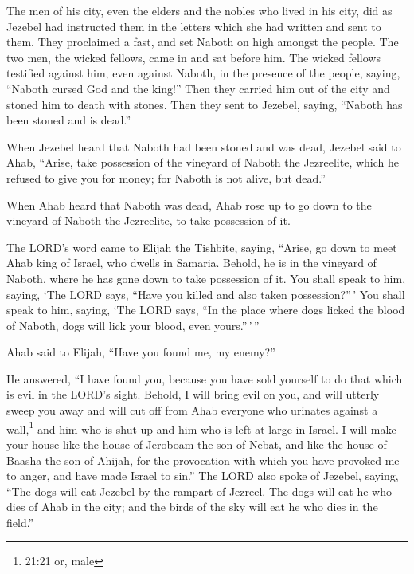  The men of his city, even the elders and the nobles who
lived in his city, did as Jezebel had instructed them in the letters
which she had written and sent to them.  They proclaimed a
fast, and set Naboth on high amongst the people.  The two
men, the wicked fellows, came in and sat before him. The wicked fellows
testified against him, even against Naboth, in the presence of the
people, saying, ``Naboth cursed God and the king!'' Then they carried
him out of the city and stoned him to death with stones. 
Then they sent to Jezebel, saying, ``Naboth has been stoned and is
dead.''

 When Jezebel heard that Naboth had been stoned and was
dead, Jezebel said to Ahab, ``Arise, take possession of the vineyard of
Naboth the Jezreelite, which he refused to give you for money; for
Naboth is not alive, but dead.''

 When Ahab heard that Naboth was dead, Ahab rose up to go
down to the vineyard of Naboth the Jezreelite, to take possession of it.

 The LORD's word came to Elijah the Tishbite, saying,
 ``Arise, go down to meet Ahab king of Israel, who dwells
in Samaria. Behold, he is in the vineyard of Naboth, where he has gone
down to take possession of it.  You shall speak to him,
saying, `The LORD says, ``Have you killed and also taken
possession?''\,' You shall speak to him, saying, `The LORD says, ``In
the place where dogs licked the blood of Naboth, dogs will lick your
blood, even yours.''\,'\,''

 Ahab said to Elijah, ``Have you found me, my enemy?''

He answered, ``I have found you, because you have sold yourself to do
that which is evil in the LORD's sight.  Behold, I will
bring evil on you, and will utterly sweep you away and will cut off from
Ahab everyone who urinates against a wall,\footnote{21:21 or, male} and
him who is shut up and him who is left at large in Israel. 
I will make your house like the house of Jeroboam the son of Nebat, and
like the house of Baasha the son of Ahijah, for the provocation with
which you have provoked me to anger, and have made Israel to sin.''
 The LORD also spoke of Jezebel, saying, ``The dogs will
eat Jezebel by the rampart of Jezreel.  The dogs will eat
he who dies of Ahab in the city; and the birds of the sky will eat he
who dies in the field.''

